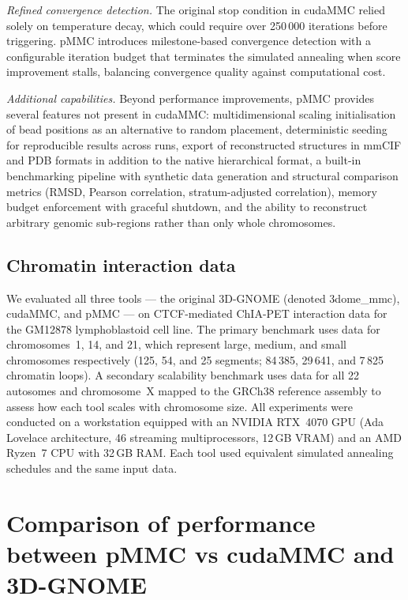 \documentclass[webpdf,traditional,large]{oup-authoring-template}%
\begin{document}
\textit{Refined convergence detection.} The original stop condition in cudaMMC relied solely on temperature decay, which could require over 250\,000 iterations before triggering. pMMC introduces milestone-based convergence detection with a configurable iteration budget that terminates the simulated annealing when score improvement stalls, balancing convergence quality against computational cost.

\textit{Additional capabilities.} Beyond performance improvements, pMMC provides several features not present in cudaMMC: multidimensional scaling initialisation of bead positions as an alternative to random placement, deterministic seeding for reproducible results across runs, export of reconstructed structures in mmCIF and PDB formats in addition to the native hierarchical format, a built-in benchmarking pipeline with synthetic data generation and structural comparison metrics (RMSD, Pearson correlation, stratum-adjusted correlation), memory budget enforcement with graceful shutdown, and the ability to reconstruct arbitrary genomic sub-regions rather than only whole chromosomes.

\subsection{Chromatin interaction data}

We evaluated all three tools --- the original 3D-GNOME (denoted 3dome\_mmc), cudaMMC, and pMMC --- on CTCF-mediated ChIA-PET interaction data for the GM12878 lymphoblastoid cell line. The primary benchmark uses data for chromosomes~1, 14, and 21, which represent large, medium, and small chromosomes respectively (125, 54, and 25 segments; 84\,385, 29\,641, and 7\,825 chromatin loops). A secondary scalability benchmark uses data for all 22 autosomes and chromosome~X mapped to the GRCh38 reference assembly to assess how each tool scales with chromosome size. All experiments were conducted on a workstation equipped with an NVIDIA RTX~4070 GPU (Ada Lovelace architecture, 46 streaming multiprocessors, 12\,GB VRAM) and an AMD Ryzen~7 CPU with 32\,GB RAM. Each tool used equivalent simulated annealing schedules and the same input data.


\section{Comparison of performance between pMMC vs cudaMMC and 3D-GNOME}
\end{document}
